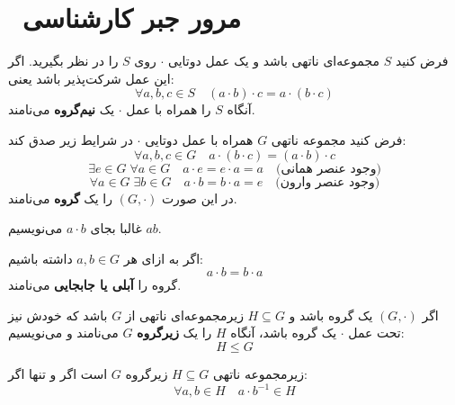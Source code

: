 \section{ مرور جبر کارشناسی}


\begin{definition}
    فرض کنید \( S \) مجموعه‌ای ناتهی باشد و یک عمل دوتایی \(\cdot\) روی \( S \) را در نظر بگیرید.
    اگر این عمل شرکت‌پذیر باشد یعنی:
    \[
        \forall a, b, c \in S \quad (a \cdot b) \cdot c = a \cdot (b \cdot c)
    \]
    آنگاه \( S \) را همراه با عمل \(\cdot\) یک \textbf{نیم‌گروه } می‌نامند.

\end{definition}



\begin{definition}[گروه]
    فرض کنید مجموعه ناتهی \( G \) همراه با عمل دوتایی \(\cdot\) در شرایط زیر صدق کند:
    \[\forall a, b, c \in G \quad a \cdot (b \cdot c) = (a \cdot b) \cdot c\]
    \[\exists e \in G \; \forall a \in G \quad a \cdot e = e \cdot a = a \quad \text{(وجود عنصر همانی)}\]
    \[\forall a \in G \; \exists b \in G \quad a \cdot b = b \cdot a = e \quad \text{(وجود عنصر وارون)}\]
    در این صورت \( (G, \cdot) \) را یک \textbf{گروه} می‌نامند.

\end{definition}
\begin{remark}
    غالبا  بجای \( a \cdot b \) می‌نویسیم \( ab \).

\end{remark}
\begin{definition}
    اگر به ازای هر \( a, b \in G \) داشته باشیم:
    \[
        a \cdot b = b \cdot a
    \]
    گروه را \textbf{آبلی یا جابجایی} می‌نامند.
\end{definition}


\begin{definition}[  زیرگروه]
    اگر \( (G, \cdot) \) یک گروه باشد و \( H \subseteq G \) زیرمجموعه‌ای ناتهی از \( G \) باشد که خودش نیز تحت عمل \(\cdot\) یک گروه باشد، آنگاه \( H \) را یک \textbf{زیرگروه} \( G \) می‌نامند و می‌نویسیم:
    \[
        H \leq G
    \]

\end{definition}

\begin{theorem}

    زیرمجموعه ناتهی \( H \subseteq G \) زیرگروه \( G \) است اگر و تنها اگر:
    \[
        \forall a, b \in H \quad a \cdot b^{-1} \in H
    \]
\end{theorem}


